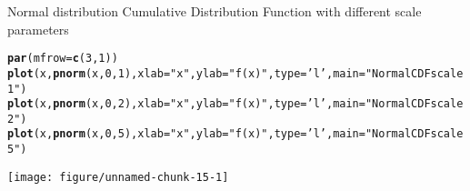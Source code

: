 \documentclass{article}\usepackage[]{graphicx}\usepackage[]{xcolor}
\makeatletter
\def\maxwidth{ %
  \ifdim\Gin@nat@width>\linewidth
    \linewidth
  \else
    \Gin@nat@width
  \fi
}
\newcommand{\hlnum}[1]{\textcolor[rgb]{0.686,0.059,0.569}{#1}}%
\newcommand{\hlsng}[1]{\textcolor[rgb]{0.192,0.494,0.8}{#1}}%
\newcommand{\hldef}[1]{\textcolor[rgb]{0.345,0.345,0.345}{#1}}%
\newcommand{\hlkwc}[1]{\textcolor[rgb]{0.333,0.667,0.333}{#1}}%
\newcommand{\hlkwd}[1]{\textcolor[rgb]{0.737,0.353,0.396}{\textbf{#1}}}%
\newenvironment{kframe}{%
 \def\at@end@of@kframe{}%
 \ifinner\ifhmode%
  \def\at@end@of@kframe{\end{minipage}}%
  \begin{minipage}{\columnwidth}%
 \fi\fi%
 \def\FrameCommand##1{\hskip\@totalleftmargin \hskip-\fboxsep
 \colorbox{shadecolor}{##1}\hskip-\fboxsep
     \hskip-\linewidth \hskip-\@totalleftmargin \hskip\columnwidth}%
 \MakeFramed {\advance\hsize-\width
   \@totalleftmargin\z@ \linewidth\hsize
   \@setminipage}}%
 {\par\unskip\endMakeFramed%
 \at@end@of@kframe}
\newenvironment{knitrout}{}{} %
\makeatother
\begin{document}
Normal distribution Cumulative Distribution Function with different scale parameters
\begin{knitrout}
\color{fgcolor}\begin{kframe}
\begin{alltt}
\hlkwd{par}\hldef{(}\hlkwc{mfrow}\hldef{=}\hlkwd{c}\hldef{(}\hlnum{3}\hldef{,}\hlnum{1}\hldef{))}
\hlkwd{plot}\hldef{(x,}\hlkwd{pnorm}\hldef{(x,}\hlnum{0}\hldef{,}\hlnum{1}\hldef{),}\hlkwc{xlab}\hldef{=}\hlsng{"x"}\hldef{,}\hlkwc{ylab}\hldef{=}\hlsng{"f(x)"}\hldef{,} \hlkwc{type}\hldef{=}\hlsng{'l'}\hldef{,} \hlkwc{main}\hldef{=}\hlsng{"Normal CDF scale 1"}\hldef{)}
\hlkwd{plot}\hldef{(x,}\hlkwd{pnorm}\hldef{(x,}\hlnum{0}\hldef{,}\hlnum{2}\hldef{),}\hlkwc{xlab}\hldef{=}\hlsng{"x"}\hldef{,} \hlkwc{ylab}\hldef{=}\hlsng{"f(x)"}\hldef{,} \hlkwc{type}\hldef{=}\hlsng{'l'}\hldef{,} \hlkwc{main}\hldef{=}\hlsng{"Normal CDF scale 2"}\hldef{)}
\hlkwd{plot}\hldef{(x,}\hlkwd{pnorm}\hldef{(x,}\hlnum{0}\hldef{,}\hlnum{5}\hldef{),}\hlkwc{xlab}\hldef{=}\hlsng{"x"}\hldef{,} \hlkwc{ylab}\hldef{=}\hlsng{"f(x)"}\hldef{,} \hlkwc{type}\hldef{=}\hlsng{'l'}\hldef{,} \hlkwc{main}\hldef{=}\hlsng{"Normal CDF scale 5"}\hldef{)}
\end{alltt}
\end{kframe}
\texttt{[image: figure/unnamed-chunk-15-1]} 
\end{knitrout}
\end{document}
